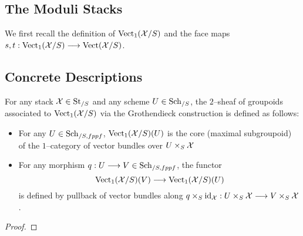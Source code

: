 \documentclass[11pt]{amsart}
\begin{document}
\subsection{The Moduli Stacks}

We first recall the definition of $\mathrm{Vect}_1(\mathcal{X}/S)$ and the face maps
$s, t : \Vect_1(\mcX/S) \to \Vect(\mcX/S)$.


\subsection{Concrete Descriptions}

\begin{thm}\label{thm:Vect1-psfunctor}
For any stack $\mathcal{X} \in \mathrm{St}_{/S}$ and any scheme $U \in \mathrm{Sch}_{/S}$,
the $2$--sheaf of groupoids associated to $\mathrm{Vect}_1(\mathcal{X}/S)$ via the Grothendieck
construction is defined as follows:
\begin{itemize}
\item For any $U \in \mathrm{Sch}_{/S, fppf}$,
$\mathrm{Vect}_1(\mathcal{X}/S)(U)$ is the core (maximal subgroupoid) of the $1$--category of
vector bundles over $U \times_S \mathcal{X}$

\item For any morphism $q : U \to V \in \Sch_{/S, fppf}$, the functor
\[
\Vect_1(\mcX/S)(V) \to \Vect_1(\mcX/S)(U)
\]
is defined by pullback of vector bundles along
$q \times_S \id_\mcX : U \times_S \mcX \to V \times_S \mcX$.
\end{itemize}
\end{thm}
\begin{proof}
\end{proof}
\end{document}
